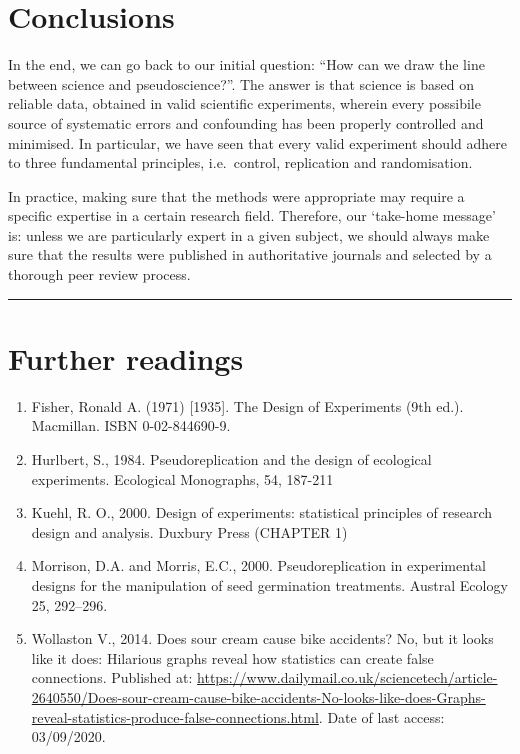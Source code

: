 \documentclass[a4paper,12pt,oneside]{book}
\providecommand{\tightlist}{%
  \setlength{\itemsep}{0pt}\setlength{\parskip}{0pt}}
\begin{document}
\hypertarget{conclusions}{%
\section{Conclusions}\label{conclusions}}

In the end, we can go back to our initial question: ``How can we draw the line between science and pseudoscience?''. The answer is that science is based on reliable data, obtained in valid scientific experiments, wherein every possibile source of systematic errors and confounding has been properly controlled and minimised. In particular, we have seen that every valid experiment should adhere to three fundamental principles, i.e.~control, replication and randomisation.

In practice, making sure that the methods were appropriate may require a specific expertise in a certain research field. Therefore, our `take-home message' is: unless we are particularly expert in a given subject, we should always make sure that the results were published in authoritative journals and selected by a thorough peer review process.

\begin{center}\rule{0.5\linewidth}{0.5pt}\end{center}

\hypertarget{further-readings}{%
\section{Further readings}\label{further-readings}}

\begin{enumerate}
\def\labelenumi{\arabic{enumi}.}
\tightlist
\item
  Fisher, Ronald A. (1971) {[}1935{]}. The Design of Experiments (9th ed.). Macmillan. ISBN 0-02-844690-9.
\item
  Hurlbert, S., 1984. Pseudoreplication and the design of ecological experiments. Ecological Monographs, 54, 187-211
\item
  Kuehl, R. O., 2000. Design of experiments: statistical principles of research design and analysis. Duxbury Press (CHAPTER 1)
\item
  Morrison, D.A. and Morris, E.C., 2000. Pseudoreplication in experimental designs for the manipulation of seed germination treatments. Austral Ecology 25, 292--296.
\item
  Wollaston V., 2014. Does sour cream cause bike accidents? No, but it looks like it does: Hilarious graphs reveal how statistics can create false connections. Published at: \url{https://www.dailymail.co.uk/sciencetech/article-2640550/Does-sour-cream-cause-bike-accidents-No-looks-like-does-Graphs-reveal-statistics-produce-false-connections.html}. Date of last access: 03/09/2020.
\end{enumerate}
\end{document}
